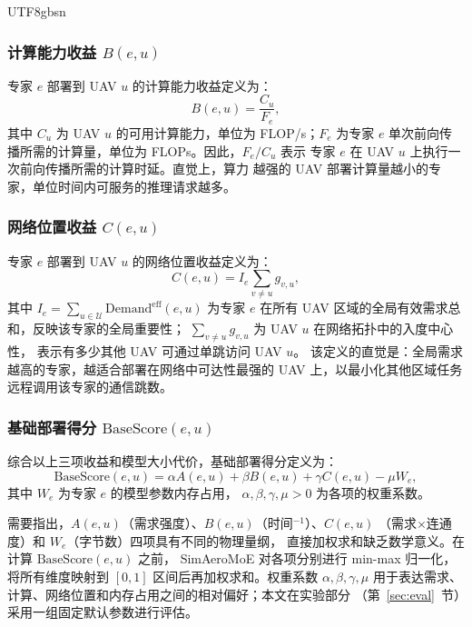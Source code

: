 \documentclass[conference]{IEEEtran}
\begin{document}
\begin{CJK*}{UTF8}{gbsn}
\subsubsection{计算能力收益 \texorpdfstring{$B(e,u)$}{B(e,u)}}

专家 $e$ 部署到 UAV $u$ 的计算能力收益定义为：
\begin{equation}
B(e,u) = \frac{C_u}{F_e},
\label{eq:B}
\end{equation}
其中 $C_u$ 为 UAV $u$ 的可用计算能力，单位为 FLOP/s；$F_e$ 为专家
$e$ 单次前向传播所需的计算量，单位为 FLOPs。因此，$F_e/C_u$ 表示
专家 $e$ 在 UAV $u$ 上执行一次前向传播所需的计算时延。直觉上，算力
越强的 UAV 部署计算量越小的专家，单位时间内可服务的推理请求越多。

\subsubsection{网络位置收益 \texorpdfstring{$C(e,u)$}{C(e,u)}}

专家 $e$ 部署到 UAV $u$ 的网络位置收益定义为：
\begin{equation}
C(e,u) = I_e \sum_{v\neq u} g_{v,u},
\label{eq:C}
\end{equation}
其中
$I_e = \sum_{u\in\mathcal{U}} \mathrm{Demand}^{\mathrm{eff}}(e,u)$
为专家 $e$ 在所有 UAV 区域的全局有效需求总和，反映该专家的全局重要性；
$\sum_{v\neq u} g_{v,u}$ 为 UAV $u$ 在网络拓扑中的入度中心性，
表示有多少其他 UAV 可通过单跳访问 UAV $u$。
该定义的直觉是：全局需求越高的专家，越适合部署在网络中可达性最强的
UAV 上，以最小化其他区域任务远程调用该专家的通信跳数。

\subsubsection{基础部署得分 \texorpdfstring{$\mathrm{BaseScore}(e,u)$}{BaseScore(e,u)}}

综合以上三项收益和模型大小代价，基础部署得分定义为：
\begin{equation}
\mathrm{BaseScore}(e,u) =
\alpha A(e,u) + \beta B(e,u) + \gamma C(e,u) - \mu W_e,
\label{eq:basescore}
\end{equation}
其中 $W_e$ 为专家 $e$ 的模型参数内存占用，
$\alpha,\beta,\gamma,\mu > 0$ 为各项的权重系数。

需要指出，$A(e,u)$（需求强度）、$B(e,u)$（时间$^{-1}$）、$C(e,u)$
（需求$\times$连通度）和 $W_e$（字节数）四项具有不同的物理量纲，
直接加权求和缺乏数学意义。在计算 $\mathrm{BaseScore}(e,u)$ 之前，
SimAeroMoE 对各项分别进行 min-max 归一化，将所有维度映射到 $[0,1]$
区间后再加权求和。权重系数 $\alpha,\beta,\gamma,\mu$ 用于表达需求、
计算、网络位置和内存占用之间的相对偏好；本文在实验部分
（第~\ref{sec:eval}~节）采用一组固定默认参数进行评估。


\end{CJK*}
\end{document}
